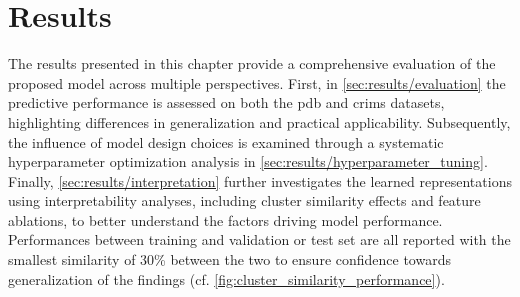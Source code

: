 \chapter{Results} \label{chapter:results} 
The results presented in this chapter provide a comprehensive evaluation of the proposed model across multiple perspectives. First, in \autoref{sec:results/evaluation} the predictive performance is assessed on both the \gls{pdb} and \gls{crims} datasets, highlighting differences in generalization and practical applicability. Subsequently, the influence of model design choices is examined through a systematic hyperparameter optimization analysis in \autoref{sec:results/hyperparameter_tuning}. Finally, \autoref{sec:results/interpretation} further investigates the learned representations using interpretability analyses, including cluster similarity effects and feature ablations, to better understand the factors driving model performance. Performances between training and validation or test set are all reported with the smallest similarity of 30\% between the two to ensure confidence towards generalization of the findings (cf. \autoref{fig:cluster_similarity_performance}). 






